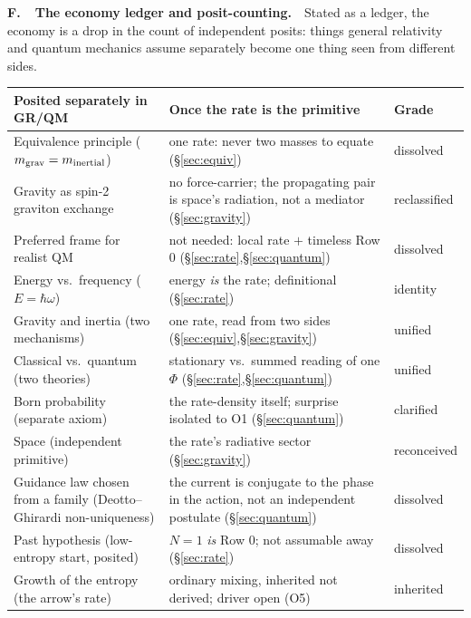 \documentclass[11pt]{article}
\begin{document}
\medskip
\noindent\textbf{F.\ \ The economy ledger and posit-counting.}\ \
Stated as a ledger, the economy is a drop in the count of independent posits: things general relativity and
quantum mechanics assume separately become one thing seen from different sides.
\begin{center}\small
\renewcommand{\arraystretch}{1.2}
\begin{tabular}{@{}>{\raggedright}p{} >{\raggedright}p{} p{}@{}}
\toprule
\textbf{Posited separately in GR/QM} & \textbf{Once the rate is the primitive} & \textbf{Grade}\\\midrule
Equivalence principle ($m_{\rm grav}=m_{\rm inertial}$) & one rate: never two masses to equate (\S\ref{sec:equiv}) & dissolved\\
Gravity as spin-2 graviton exchange & no force-carrier; the propagating pair is space's radiation, not a mediator (\S\ref{sec:gravity}) & reclassified\\
Preferred frame for realist QM & not needed: local rate $+$ timeless Row 0 (\S\ref{sec:rate},\S\ref{sec:quantum}) & dissolved\\
Energy vs.\ frequency ($E=\hbar\omega$) & energy \emph{is} the rate; definitional (\S\ref{sec:rate}) & identity\\
Gravity and inertia (two mechanisms) & one rate, read from two sides (\S\ref{sec:equiv},\S\ref{sec:gravity}) & unified\\
Classical vs.\ quantum (two theories) & stationary vs.\ summed reading of one $\Phi$ (\S\ref{sec:rate},\S\ref{sec:quantum}) & unified\\
Born probability (separate axiom) & the rate-density itself; surprise isolated to O1 (\S\ref{sec:quantum}) & clarified\\
Space (independent primitive) & the rate's radiative sector (\S\ref{sec:gravity}) & reconceived\\
Guidance law chosen from a family (Deotto--Ghirardi non-uniqueness) & the current is conjugate to the phase in the action, not an independent postulate (\S\ref{sec:quantum}) & dissolved\\
Past hypothesis (low-entropy start, posited) & $N=1$ \emph{is} Row 0; not assumable away (\S\ref{sec:rate}) & dissolved\\
Growth of the entropy (the arrow's rate) & ordinary mixing, inherited not derived; driver open (O5) & inherited\\
\bottomrule
\end{tabular}
\end{center}
\end{document}
